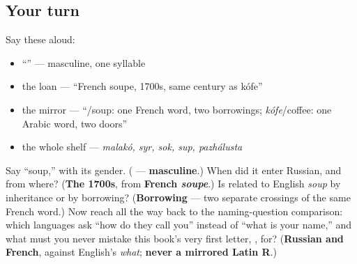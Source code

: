 \subsection*{Your turn}
Say these aloud:

\begin{itemize}
\raggedright
  \item \textquotedblleft{}\textquotedblright{} — masculine, one syllable
  \item the loan — \textquotedblleft{}French soupe, 1700s, same century as kófe\textquotedblright{}
  \item the mirror — \textquotedblleft{}/soup: one French word, two borrowings; \emph{kófe}/coffee: one Arabic word, two doors\textquotedblright{}
  \item the whole shelf — \emph{malakó, syr, sok, sup, pazhálusta}
\end{itemize}

\begin{tcolorbox}[breakable,colback=teal!4,colframe=teal!35!black,title={Before you move on}]
Say \textquotedblleft{}soup,\textquotedblright{} with its gender. (\textbf{} — \textbf{masculine}.) When did it enter Russian, and from where? (\textbf{The 1700s}, from \textbf{French \emph{soupe}}.) Is \emph{} related to English \emph{soup} by inheritance or by borrowing? (\textbf{Borrowing} — two separate crossings of the same French word.) Now reach all the way back to the naming-question comparison: which languages ask \textquotedblleft{}how do they call you\textquotedblright{} instead of \textquotedblleft{}what is your name,\textquotedblright{} and what must you never mistake this book's very first letter, \textbf{}, for? (\textbf{Russian and French}, against English's \emph{what}; \textbf{never a mirrored Latin R}.)
\end{tcolorbox}
